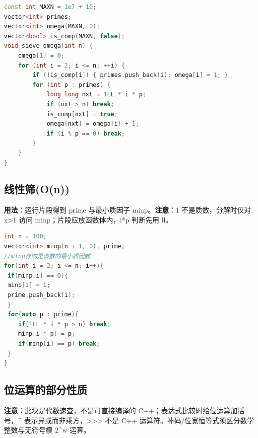 \documentclass[a4paper,9pt]{extarticle}
\begin{document}
\begin{lstlisting}[language={C++}]
const int MAXN = 1e7 + 10;
vector<int> primes;
vector<int> omega(MAXN, 0);
vector<bool> is_comp(MAXN, false);
void sieve_omega(int n) {
    omega[1] = 0;
    for (int i = 2; i <= n; ++i) {
        if (!is_comp[i]) { primes.push_back(i); omega[i] = 1; }
        for (int p : primes) {
            long long nxt = 1LL * i * p;
            if (nxt > n) break;
            is_comp[nxt] = true;
            omega[nxt] = omega[i] + 1;
            if (i % p == 0) break;
        }
    }
}
\end{lstlisting}
\subsection{线性筛(O(n))}

\textbf{用法}：运行片段得到 prime 与最小质因子 minp。\textbf{注意}：1 不是质数，分解时仅对 x>1 访问 minp；片段应放函数体内，i*p 判断先用 ll。

\begin{lstlisting}[language={C++}]
int n = 100;
vector<int> minp(n + 1, 0), prime;
//minp存的是该数的最小质因数
for(int i = 2; i <= n; i++){
 if(minp[i] == 0){
 minp[i] = i;
 prime.push_back(i);
 }
 for(auto p : prime){
    if(1LL * i * p > n) break;
    minp[i * p] = p;
    if(minp[i] == p) break;
 }
}
\end{lstlisting}

\subsection{位运算的部分性质}

\textbf{注意}：此块是代数速查，不是可直接编译的 C+\allowbreak{}+；表达式比较时给位运算加括号，\textasciicircum{} 表示异或而非乘方，>>> 不是 C++ 运算符。补码/位宽恒等式须区分数学整数与无符号模 2\textasciicircum{}w 运算。
\end{document}

